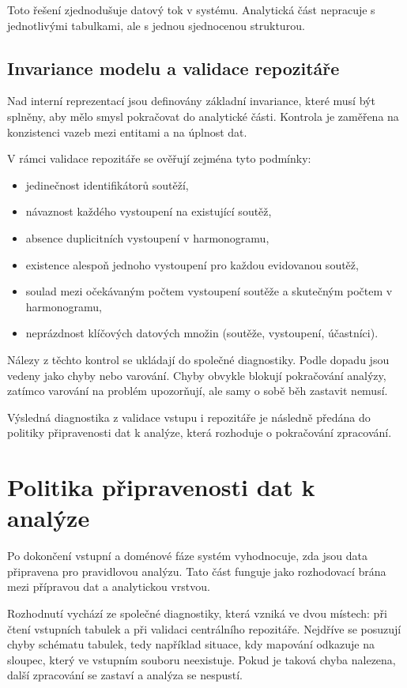 \documentclass[czech, kiv, ba, he, iso690alph, pdf]{fasthesis}
\begin{document}
				Toto řešení zjednodušuje datový tok v systému. Analytická část nepracuje s jednotlivými tabulkami, ale s jednou sjednocenou strukturou.
	
			\subsection{Invariance modelu a validace repozitáře}
				Nad interní reprezentací jsou definovány základní invariance, které musí být splněny, aby mělo smysl pokračovat do analytické části. Kontrola je zaměřena na konzistenci vazeb mezi entitami a na úplnost dat.
	
				V rámci validace repozitáře se ověřují zejména tyto podmínky:
				\begin{itemize}
					\item jedinečnost identifikátorů soutěží,
					\item návaznost každého vystoupení na existující soutěž,
					\item absence duplicitních vystoupení v harmonogramu,
					\item existence alespoň jednoho vystoupení pro každou evidovanou soutěž,
					\item soulad mezi očekávaným počtem vystoupení soutěže a skutečným počtem v harmonogramu,
					\item neprázdnost klíčových datových množin (soutěže, vystoupení, účastníci).
				\end{itemize}
	
				Nálezy z těchto kontrol se ukládají do společné diagnostiky. Podle dopadu jsou vedeny jako chyby nebo varování. Chyby obvykle blokují pokračování analýzy, zatímco varování na problém upozorňují, ale samy o sobě běh zastavit nemusí.
	
				Výsledná diagnostika z validace vstupu i repozitáře je následně předána do politiky připravenosti dat k analýze, která rozhoduje o pokračování zpracování.
	
		\section{Politika připravenosti dat k analýze}
	
			Po dokončení vstupní a doménové fáze systém vyhodnocuje, zda jsou data připravena pro pravidlovou analýzu. Tato část funguje jako rozhodovací brána mezi přípravou dat a analytickou vrstvou.
	
			Rozhodnutí vychází ze společné diagnostiky, která vzniká ve dvou místech: při čtení vstupních tabulek a při validaci centrálního repozitáře. Nejdříve se posuzují chyby schématu tabulek, tedy například situace, kdy mapování odkazuje na sloupec, který ve vstupním souboru neexistuje. Pokud je taková chyba nalezena, další zpracování se zastaví a analýza se nespustí.
	
\end{document}
